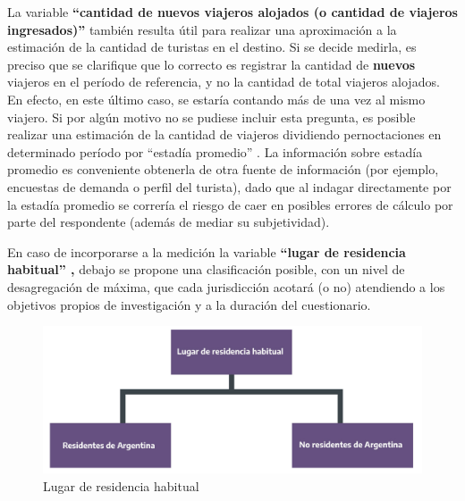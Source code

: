 \documentclass[
]{book}
\begin{document}
La variable \textbf{``cantidad de nuevos viajeros alojados (o cantidad de viajeros ingresados)''} también resulta útil para realizar una aproximación a la estimación de la cantidad de turistas en el destino. Si se decide medirla, es preciso que se clarifique que lo correcto es registrar la cantidad de \textbf{nuevos} viajeros en el período de referencia, y no la cantidad de total viajeros alojados. En efecto, en este último caso, se estaría contando más de una vez al mismo viajero. Si por algún motivo no se pudiese incluir esta pregunta, es posible realizar una estimación de la cantidad de viajeros dividiendo pernoctaciones en determinado período por ``estadía promedio'' . La información sobre estadía promedio es conveniente obtenerla de otra fuente de información (por ejemplo, encuestas de demanda o perfil del turista), dado que al indagar directamente por la estadía promedio se correría el riesgo de caer en posibles errores de cálculo por parte del respondente (además de mediar su subjetividad).

En caso de incorporarse a la medición la variable \textbf{``lugar de residencia habitual'' ,} debajo se propone una clasificación posible, con un nivel de desagregación de máxima, que cada jurisdicción acotará (o no) atendiendo a los objetivos propios de investigación y a la duración del cuestionario.

\begin{figure}

{\centering \includegraphics[width=1\linewidth]{imagenes/figura_2} 

}

\caption{Lugar de residencia habitual}\label{fig:residencia-habitual}
\end{figure}
\end{document}
